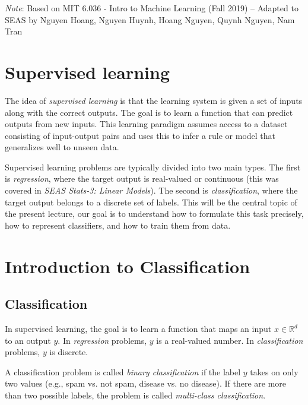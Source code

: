 \documentclass[11pt]{article}
\newcommand{\qn}[1]{\textcolor{orange}{Quynh: #1}}
\begin{document}


\emph{Note}: Based on MIT 6.036 - Intro to Machine Learning (Fall 2019) -- Adapted to SEAS by Nguyen Hoang, Nguyen Huynh, Hoang Nguyen, Quynh Nguyen, Nam Tran


\section{Supervised learning}

The idea of \textit{supervised learning} is that the learning system is given a set of inputs along with the correct outputs. The goal is to learn a function that can predict outputs from new inputs. This learning paradigm assumes access to a dataset consisting of input-output pairs and uses this to infer a rule or model that generalizes well to unseen data.

Supervised learning problems are typically divided into two main types. The first is 	\textit{regression}, where the target output is real-valued or continuous (this was covered in 	\textit{SEAS Stats-3: Linear Models}). The second is \textit{classification}, where the target output belongs to a discrete set of labels. This will be the central topic of the present lecture, our goal is to understand how to formulate this task precisely, how to represent classifiers, and how to train them from data.


\section{Introduction to Classification}

\subsection{Classification}

In supervised learning, the goal is to learn a function that maps an input \( x \in \mathbb{R}^d \) to an output \( y \). In \textit{regression} problems, \( y \) is a real-valued number. In \textit{classification} problems, \( y \) is discrete.

A classification problem is called \textit{binary classification} if the label \( y \) takes on only two values (e.g., spam vs. not spam, disease vs. no disease). If there are more than two possible labels, the problem is called \textit{multi-class classification}.
\end{document}
